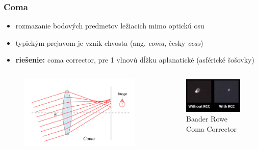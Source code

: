 \documentclass[10pt,xcolor=pdflatex]{beamer}
\begin{document}
\begin{frame}\frametitle{Coma}
    \begin{itemize}
        \item rozmazanie bodových predmetov ležiacich mimo optickú osu 
        \item typickým prejavom je vznik chvosta (ang. \textit{coma}, česky \textit{ocas})
        \item \textbf{riešenie:} coma corrector, pre 1 vlnovú dĺžku aplanatické (asférické šošovky)
    \end{itemize}

    \begin{columns}
        \begin{figure}
            \includegraphics[scale=0.15]{img/coma.png}
        \end{figure}

        \begin{figure}
            \includegraphics[scale=0.20]{img/coma.jpg}
            \caption{Baader Rowe Coma Corrector}
        \end{figure}
    \end{columns}
\end{frame}
\end{document}
